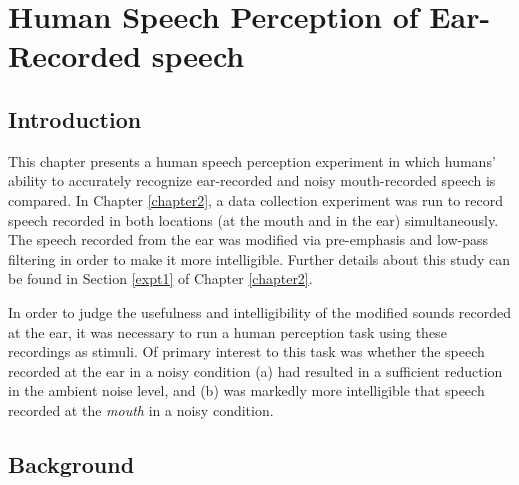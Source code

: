 % 
% 
% 

\chapter{Human Speech Perception of Ear-Recorded speech\label{chapter3}}


\section{Introduction}\label{chap3:introduction}

This chapter presents a human speech perception experiment in which humans' ability to accurately recognize ear-recorded and noisy mouth-recorded speech is compared.  In Chapter \ref{chapter2}, a data collection experiment was run to record speech recorded in both locations (at the mouth and in the ear) simultaneously.  The speech recorded from the ear was modified via pre-emphasis and low-pass filtering in order to make it more intelligible.  Further details about this study can be found in Section \ref{expt1} of Chapter \ref{chapter2}.

In order to judge the usefulness and intelligibility of the modified sounds recorded at the ear, it was necessary to run a human perception task using these recordings as stimuli.  Of primary interest to this task was whether the speech recorded at the ear in a noisy condition (a) had resulted in a sufficient reduction in the ambient noise level, and (b) was markedly more intelligible that speech recorded at the \textit{mouth} in a noisy condition.

\section{Background}\label{chap3:background}

